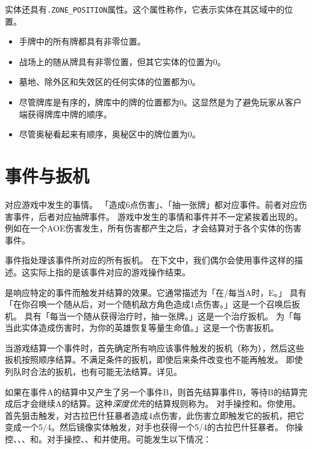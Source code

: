 实体还具有\texttt{.ZONE\_POSITION}属性。这个属性称作，它表示实体在其区域中的位置。
\begin{itemize}
    \item 手牌中的所有牌都具有非零位置。
    \item 战场上的随从牌具有非零位置，但其它实体的位置为0。
    \item 墓地、除外区和失效区的任何实体的位置都为0。
    \item 尽管牌库是有序的，牌库中的牌的位置都为0。这显然是为了避免玩家从客户端获得牌库中牌的顺序。
    \item 尽管奥秘看起来有顺序，奥秘区中的牌位置为0。
\end{itemize}

\section{事件与扳机}
\label{event-and-trigger}

对应游戏中发生的事情。
\example 「造成6点伤害」、「抽一张牌」都对应事件。前者对应伤害事件，后者对应抽牌事件。
\notice 游戏中发生的事情和事件并不一定紧挨着出现的。例如在一个AOE伤害发生，所有伤害都产生之后，才会结算对于各个实体的伤害事件。

事件指处理该事件所对应的所有扳机。
\notice 在下文中，我们偶尔会使用事件这样的描述。这实际上指的是该事件对应的游戏操作结束。

是响应特定的事件而触发并结算的效果。它通常描述为「在/每当A时，E。」
\example {}具有「在你召唤一个随从后，对一个随机敌方角色造成1点伤害。」这是一个召唤后扳机。
\example {}具有「每当一个随从获得治疗时，抽一张牌。」这是一个治疗扳机。
\example {}为「每当此实体造成伤害时，为你的英雄恢复等量生命值。」这是一个伤害扳机。

当游戏结算一个事件时，首先确定所有响应该事件触发的扳机（称为），然后这些扳机按照顺序结算。不满足条件的扳机，即使后来条件改变也不能再触发。
\notice 即使列队时合法的扳机，也有可能无法结算。详见。

如果在事件A的结算中又产生了另一个事件B，则首先结算事件B，等待B的结算完成后才会继续A的结算。这种\emph{深度优先}的结算规则称为。
\example 对手操控和。你使用。首先狙击触发，对古拉巴什狂暴者造成4点伤害，此伤害立即触发它的扳机，把它变成一个5/4。然后镜像实体触发，对手也获得一个5/4的古拉巴什狂暴者。
\example 你操控、、、和。对手操控、、和并使用。可能发生以下情况：

